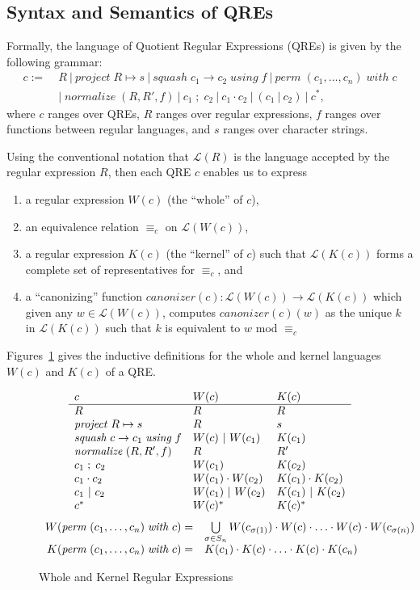 \documentclass[acmsmall,review,anonymous]{acmart}
\newcommand{\kw}[1]{\ensuremath{\mathit{#1}}}
\newcommand{\project}[2]{\ensuremath{\kw{project} \; #1 \mapsto #2}}
\newcommand{\squash}[3]{\ensuremath{\kw{squash} \; #1 \rightarrow #2\; \kw{using} \; #3}}
\newcommand{\perm}[2]{\ensuremath{\kw{perm}\; (#1)\; \kw{with}\; #2}}
\newcommand{\normalize}[3]{\ensuremath{\kw{normalize} \; (#1, #2, #3)}}
\newcommand{\sep}{\ensuremath{\ | \ }}
\newcommand{\canonizer}{\ensuremath{\kw{canonizer}}}
\newcommand{\semicolon}{\ensuremath{\; ; \;}}
\newcommand{\eqrel}[1]{\ensuremath{\equiv_{#1}}}
\begin{document}
\subsection{Syntax and Semantics of QREs}
Formally, the language of Quotient Regular Expressions (QREs) is given by the
following grammar:
\begin{align*}
c := \; &R \sep \project{R}{s} \sep \squash{c_1}{c_2}{f} \sep
\perm{c_1, \ldots, c_n}{c} \\
& | \; \normalize{R}{R'}{f} \sep c_1 \semicolon c_2 \sep c_1 \cdot c_2 \sep (c_1
\sep c_2) \sep c^*,
\end{align*}
where $c$ ranges over QREs, $R$ ranges over regular expressions, $f$ ranges over
functions between regular languages, and $s$ ranges over character strings.

Using the conventional notation that $\mathcal{L}(R)$ is the language accepted
by the regular expression $R$, then each QRE $c$ enables us to express
\begin{enumerate}
  \item a regular expression $W(c)$ (the ``whole'' of $c$),
  \item an equivalence relation $\eqrel{c}$ on $\mathcal{L}(W(c))$,
  \item a regular expression $K(c)$ (the ``kernel'' of $c$)
  such that $\mathcal{L}(K(c))$ forms a complete set of representatives for
  $\eqrel{c}$, and
  \item a ``canonizing'' function $\canonizer(c):\mathcal{L}(W(c))
  \longrightarrow \mathcal{L}(K(c))$ which given any $w \in \mathcal{L}(W(c))$,
  computes $\canonizer(c)(w)$ as the unique $k$ in $\mathcal{L}(K(c))$ such that
  $k$ is equivalent to $w$ mod $\eqrel{c}$
\end{enumerate}
Figures~\ref{fig:wk} gives the inductive definitions for the whole and
kernel languages $W(c)$ and $K(c)$ of a QRE.
\begin{figure}[t]
\centering
\[
\begin{array}{l@{\quad}l@{\quad}l}

c & W(c) & K(c) \\ \hline
R & R & R \\
\project{R}{s} & R & s \\
\squash{c}{c_1}{f} & W(c) \sep W(c_1) & K(c_1) \\
\normalize{R}{R'}{f} & R & R' \\
c_1 \; ; \; c_2 & W(c_1) & K(c_2) \\
c_1 \cdot c_2 & W(c_1) \cdot W(c_2) & K(c_1) \cdot K(c_2) \\
c_1 \sep c_2 & W(c_1) \sep W(c_2) & K(c_1) \sep K(c_2) \\
c^* & W(c)^* & K(c)^* \\
\end{array}
\]
\[
\begin{array}{r@{\quad}l}
W( \perm{c_1, \ldots, c_n}{c} ) = &
\bigcup \limits_{\sigma \in S_n} W(c_{\sigma(1)}) \cdot W(c) \cdot \ldots \cdot
W(c) \cdot W(c_{\sigma(n)})\\
K( \perm{c_1, \ldots, c_n}{c} ) = & K(c_1) \cdot K(c) \cdot \ldots \cdot K(c)
\cdot K(c_n)
\end{array}
\]
\caption{Whole and Kernel Regular Expressions}
\label{fig:wk}
\end{figure}
\end{document}
